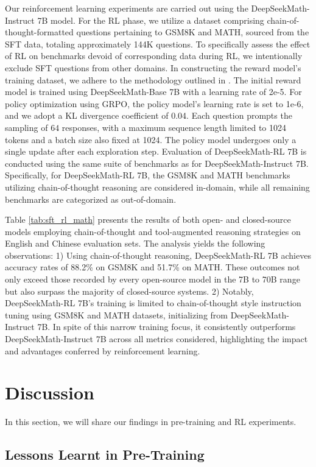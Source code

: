 \begin{itemize}[topsep=0pt]
\begin{itemize}[topsep=0pt]
Our reinforcement learning experiments are carried out using the DeepSeekMath-Instruct 7B model. For the RL phase, we utilize a dataset comprising chain-of-thought-formatted questions pertaining to GSM8K and MATH, sourced from the SFT data, totaling approximately 144K questions. To specifically assess the effect of RL on benchmarks devoid of corresponding data during RL, we intentionally exclude SFT questions from other domains. In constructing the reward model’s training dataset, we adhere to the methodology outlined in \citep{wang2023math}. The initial reward model is trained using DeepSeekMath-Base 7B with a learning rate of 2e-5. For policy optimization using GRPO, the policy model’s learning rate is set to 1e-6, and we adopt a KL divergence coefficient of 0.04. Each question prompts the sampling of $64$ responses, with a maximum sequence length limited to 1024 tokens and a batch size also fixed at 1024. The policy model undergoes only a single update after each exploration step. Evaluation of DeepSeekMath-RL 7B is conducted using the same suite of benchmarks as for DeepSeekMath-Instruct 7B. Specifically, for DeepSeekMath-RL 7B, the GSM8K and MATH benchmarks utilizing chain-of-thought reasoning are considered in-domain, while all remaining benchmarks are categorized as out-of-domain.

Table \ref{tab:sft_rl_math} presents the results of both open- and closed-source models employing chain-of-thought and tool-augmented reasoning strategies on English and Chinese evaluation sets. The analysis yields the following observations: 1) Using chain-of-thought reasoning, DeepSeekMath-RL 7B achieves accuracy rates of 88.2\% on GSM8K and 51.7\% on MATH. These outcomes not only exceed those recorded by every open-source model in the 7B to 70B range but also surpass the majority of closed-source systems. 2) Notably, DeepSeekMath-RL 7B’s training is limited to chain-of-thought style instruction tuning using GSM8K and MATH datasets, initializing from DeepSeekMath-Instruct 7B. In spite of this narrow training focus, it consistently outperforms DeepSeekMath-Instruct 7B across all metrics considered, highlighting the impact and advantages conferred by reinforcement learning.

\section{Discussion}
In this section, we will share our findings in pre-training and RL experiments. 

\subsection{Lessons Learnt in Pre-Training}


\end{itemize}
\end{itemize}
